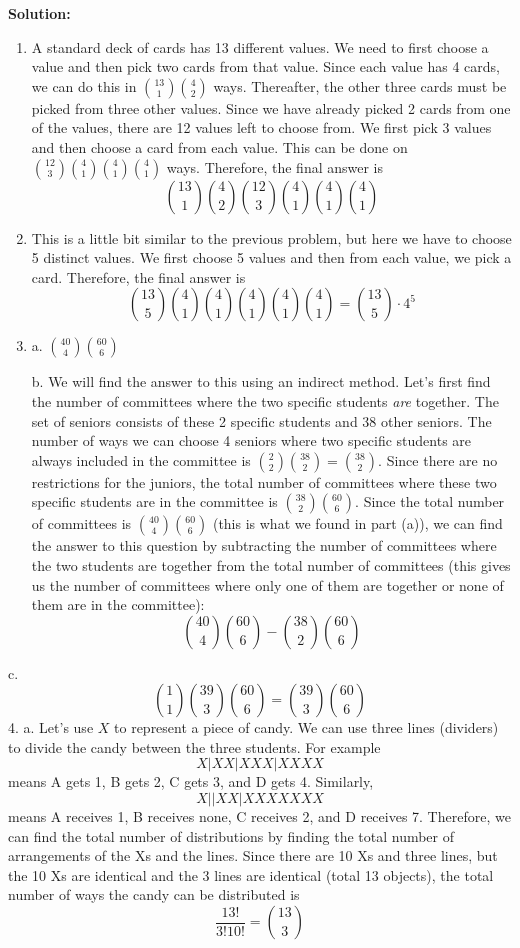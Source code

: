 \documentclass[
  12pt,
]{krantzNoCorner}
\begin{document}
\textbf{Solution:}

\begin{enumerate}
\def\labelenumi{\arabic{enumi}.}
\item
  A standard deck of cards has 13 different values. We need to first
  choose a value and then pick two cards from that value. Since each
  value has 4 cards, we can do this in \(\binom{13}{1}\binom{4}{2}\)
  ways. Thereafter, the other three cards must be picked from three
  other values. Since we have already picked 2 cards from one of the
  values, there are 12 values left to choose from. We first pick 3
  values and then choose a card from each value. This can be done on
  \(\binom{12}{3}\binom{4}{1}\binom{4}{1}\binom{4}{1}\) ways. Therefore,
  the final answer is
  \[\binom{13}{1}\binom{4}{2}\binom{12}{3}\binom{4}{1}\binom{4}{1}    \binom{4}{1}\]
\item
  This is a little bit similar to the previous problem, but here we
  have to choose 5 distinct values. We first choose 5 values and then
  from each value, we pick a card. Therefore, the final answer is
  \[\binom{13}{5}\binom{4}{1}\binom{4}{1}\binom{4}{1}\binom{4}{1}\binom{4}     {1}=\binom{13}{5}\cdot 4^5\]
\item
  a. \(\binom{40}{4}\binom{60}{6}\)

  b. We will find the answer to this using an indirect method. Let's
  first find the number of committees where the two specific students
  \textit{are} together. The set of seniors consists of these 2
  specific students and 38 other seniors. The number of ways we can
  choose 4 seniors where two specific students are always included in
  the committee is \(\binom{2}{2}\binom{38}{2}=\binom{38}{2}.\) Since
  there are no restrictions for the juniors, the total number of
  committees where these two specific students are in the committee is
  \(\binom{38}{2}\binom{60}{6}.\) Since the total number of committees
  is \(\binom{40}{4}\binom{60}{6}\) (this is what we found in part (a)),
  we can find the answer to this question by subtracting the number of
  committees where the two students are together from the total number
  of committees (this gives us the number of committees where only one
  of them are together or none of them are in the committee):
  \[\binom{40}{4}\binom{60}{6}-\binom{38}{2}\binom{60}{6}\]
\end{enumerate}

c.
\[\binom{1}{1}\binom{39}{3}\binom{60}{6}=\binom{39}{3}\binom{60}{6}\]
4. a. Let's use \(X\) to represent a piece of candy. We can use three
lines (dividers) to divide the candy between the three students. For
example \[X|XX|XXX|XXXX\] means A gets 1, B gets 2, C gets 3, and D gets
4. Similarly, \[X||XX|XXXXXXX\] means A receives 1, B receives none, C
receives 2, and D receives 7. Therefore, we can find the total number of
distributions by finding the total number of arrangements of the Xs and
the lines. Since there are 10 Xs and three lines, but the 10 Xs are
identical and the 3 lines are identical (total 13 objects), the total
number of ways the candy can be distributed is
\[\frac{13!}{3!10!}=\binom{13}{3}\]
\end{document}
